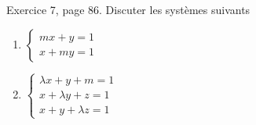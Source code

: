 \begin{exercice}\label{exoLineraire0002}

Exercice 7, page 86. Discuter les systèmes suivants
\begin{enumerate}

\item
$\left\{
\begin{array}{ll}
mx+y=1\\
x+my=1
\end{array}
\right.$

\item
$\left\{
\begin{array}{ll}
\lambda x+y+m=1\\
x+\lambda y+z=1\\
x+y+\lambda z=1
\end{array}
\right.$

\end{enumerate}


\end{exercice}
